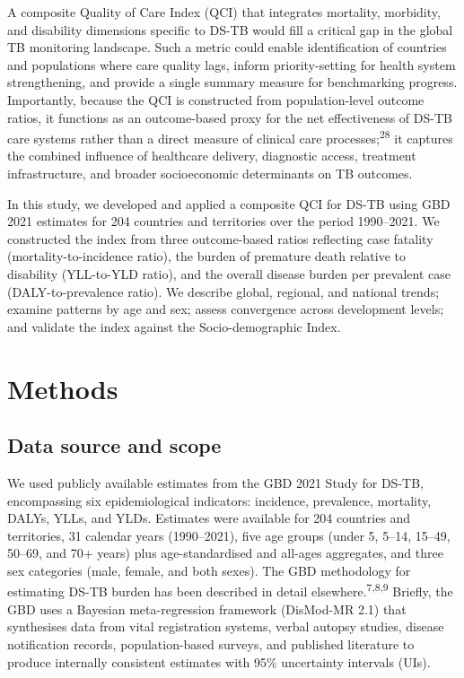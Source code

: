 \documentclass[12pt]{article}
\begin{document}
A composite Quality of Care Index (QCI) that integrates mortality, morbidity, and disability dimensions specific to DS-TB would fill a critical gap in the global TB monitoring landscape. Such a metric could enable identification of countries and populations where care quality lags, inform priority-setting for health system strengthening, and provide a single summary measure for benchmarking progress. Importantly, because the QCI is constructed from population-level outcome ratios, it functions as an outcome-based proxy for the net effectiveness of DS-TB care systems rather than a direct measure of clinical care processes;\textsuperscript{28} it captures the combined influence of healthcare delivery, diagnostic access, treatment infrastructure, and broader socioeconomic determinants on TB outcomes.

In this study, we developed and applied a composite QCI for DS-TB using GBD 2021 estimates for 204 countries and territories over the period 1990--2021. We constructed the index from three outcome-based ratios reflecting case fatality (mortality-to-incidence ratio), the burden of premature death relative to disability (YLL-to-YLD ratio), and the overall disease burden per prevalent case (DALY-to-prevalence ratio). We describe global, regional, and national trends; examine patterns by age and sex; assess convergence across development levels; and validate the index against the Socio-demographic Index.


\section{Methods}

\subsection{Data source and scope}

We used publicly available estimates from the GBD 2021 Study for DS-TB, encompassing six epidemiological indicators: incidence, prevalence, mortality, DALYs, YLLs, and YLDs. Estimates were available for 204 countries and territories, 31 calendar years (1990--2021), five age groups (under 5, 5--14, 15--49, 50--69, and 70+ years) plus age-standardised and all-ages aggregates, and three sex categories (male, female, and both sexes). The GBD methodology for estimating DS-TB burden has been described in detail elsewhere.\textsuperscript{7,8,9} Briefly, the GBD uses a Bayesian meta-regression framework (DisMod-MR 2.1) that synthesises data from vital registration systems, verbal autopsy studies, disease notification records, population-based surveys, and published literature to produce internally consistent estimates with 95\% uncertainty intervals (UIs).
\end{document}

